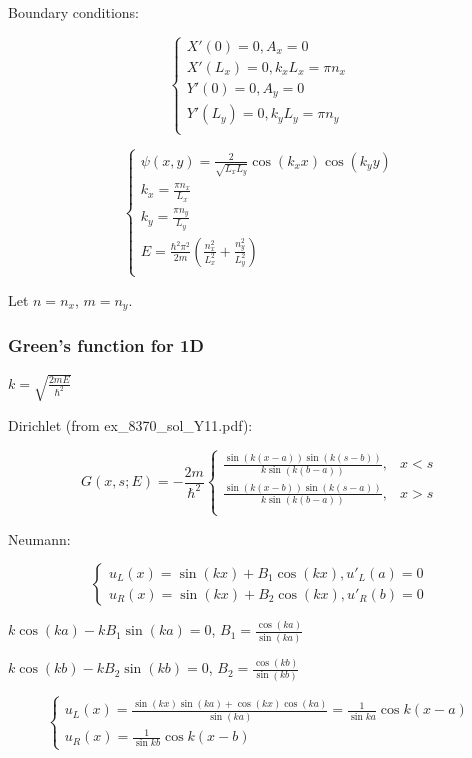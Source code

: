\documentclass[12pt, a4paper]{article}
\begin{document}
Boundary conditions:

$$\begin{cases}
X'(0) = 0, A_x = 0 \\
X'(L_x) = 0, k_x L_x = \pi n_x \\
Y'(0) = 0, A_y = 0 \\
Y'(L_y) = 0, k_y L_y = \pi n_y \\
\end{cases}$$

$$\begin{cases}
\psi(x, y) = \frac{2}{\sqrt{L_x L_y}} \cos(k_x x) \cos(k_y y) \\
k_x = \frac{\pi n_x}{L_x} \\
k_y = \frac{\pi n_y}{L_y} \\
E = \frac{\hbar^2 \pi^2}{2 m} \left(\frac{n_x^2}{L_x^2} + \frac{n_y^2}{L_y^2} \right) \\
\end{cases}$$

Let $n = n_x$, $m = n_y$.

\subsubsection{Green's function for 1D}
$k = \sqrt{\frac{2m E}{\hbar^2}}$

Dirichlet (from ex\_8370\_sol\_Y11.pdf):

$$G(x, s; E) = - \frac{2m}{\hbar^2} \begin{cases}
\frac{\sin(k(x - a)) \sin(k(s - b))}{k \sin(k(b - a))}, & x < s \\
\frac{\sin(k(x - b)) \sin(k(s - a))}{k \sin(k(b - a))}, & x > s \\
\end{cases}$$

Neumann:

$$\begin{cases}
u_L(x) = \sin(kx) + B_1 \cos(kx), u'_L(a) = 0 \\
u_R(x) = \sin(kx) + B_2 \cos(kx), u'_R(b) = 0
\end{cases}$$

$k \cos(ka) - k B_1 \sin (ka) = 0$, $B_1 = \frac{\cos(ka)}{\sin(ka)}$

$k \cos(kb) - k B_2 \sin (kb) = 0$, $B_2 = \frac{\cos(kb)}{\sin(kb)}$

$$\begin{cases}
u_L(x) = \frac{\sin(kx) \sin (ka) + \cos(kx) \cos(ka)}{\sin(ka)}
= \frac{1}{\sin ka} \cos k(x - a)\\
u_R(x) = \frac{1}{\sin kb} \cos k(x - b)
\end{cases}$$
\end{document}
